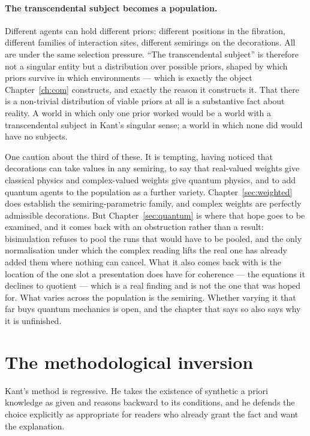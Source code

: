 \paragraph{The transcendental subject becomes a population.}
Different agents can hold different priors: different positions in
the fibration, different families of interaction sites, different
semirings on the decorations.
All are under the same selection pressure.
``The transcendental subject'' is therefore not a singular entity
but a distribution over possible priors, shaped by which priors
survive in which environments --- which is exactly the object
Chapter~\ref{ch:com} constructs, and exactly the reason it
constructs it.
That there is a non-trivial distribution of viable priors at all is
a substantive fact about reality.
A world in which only one prior worked would be a world with a
transcendental subject in Kant's singular sense; a world in which
none did would have no subjects.

One caution about the third of these.
It is tempting, having noticed that decorations can take values in
any semiring, to say that real-valued weights give classical
physics and complex-valued weights give quantum physics, and to add
quantum agents to the population as a further variety.
Chapter~\ref{sec:weighted} does establish the semiring-parametric
family, and complex weights are perfectly admissible decorations.
But Chapter~\ref{sec:quantum} is where that hope goes to be
examined, and it comes back with an obstruction rather than a
result: bisimulation refuses to pool the runs that would have to be
pooled, and the only normalisation under which the complex reading
lifts the real one has already added them where nothing can cancel.
What it also comes back with is the location of the one slot a
presentation does have for coherence --- the equations it declines
to quotient --- which is a real finding and is not the one that was
hoped for.
What varies across the population is the semiring.
Whether varying it that far buys quantum mechanics is open, and the
chapter that says so also says why it is unfinished.

\section{The methodological inversion}
\label{sec:kant-method}

Kant's method is regressive.
He takes the existence of synthetic a priori knowledge as given and
reasons backward to its conditions, and he defends the choice
explicitly as appropriate for readers who already grant the fact
and want the explanation.

